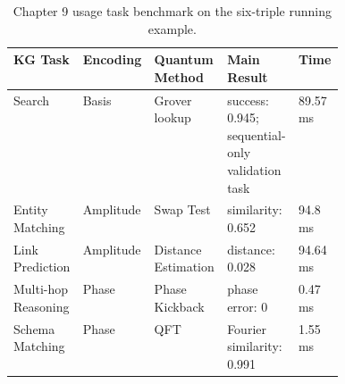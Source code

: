 \begin{table}[t]
\centering
\scriptsize
\setlength{\tabcolsep}{2pt}
\renewcommand{\arraystretch}{1.08}
\caption{Chapter 9 usage task benchmark on the six-triple running example.}
\label{tab:chapter9-usage-tasks}
\begin{tabular}{@{}p{0.085\linewidth}p{0.085\linewidth}p{0.085\linewidth}p{0.085\linewidth}p{0.085\linewidth}@{}}
\hline
KG Task & Encoding & Quantum Method & Main Result & Time \\
\hline
Search & Basis & Grover lookup & success: 0.945; sequential-only validation task & 89.57 ms \\
Entity Matching & Amplitude & Swap Test & similarity: 0.652 & 94.8 ms \\
Link Prediction & Amplitude & Distance Estimation & distance: 0.028 & 94.64 ms \\
Multi-hop Reasoning & Phase & Phase Kickback & phase error: 0 & 0.47 ms \\
Schema Matching & Phase & QFT & Fourier similarity: 0.991 & 1.55 ms \\
\hline
\end{tabular}
\end{table}
